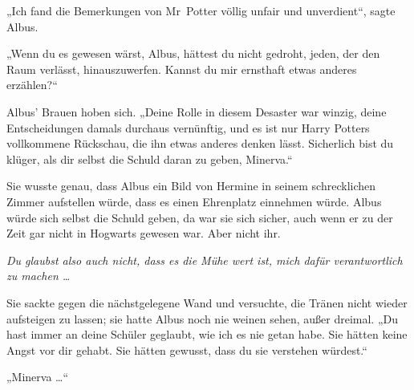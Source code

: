 „Ich fand die Bemerkungen von Mr~Potter völlig unfair und unverdient“, sagte Albus.

„Wenn du es gewesen wärst, Albus, hättest du nicht gedroht, jeden, der den Raum verlässt, hinauszuwerfen. Kannst du mir ernsthaft etwas anderes erzählen?“

Albus’ Brauen hoben sich.
„Deine Rolle in diesem Desaster war winzig, deine Entscheidungen damals durchaus vernünftig, und es ist nur Harry Potters vollkommene Rückschau, die ihn etwas anderes denken lässt. Sicherlich bist du klüger, als dir selbst die Schuld daran zu geben, Minerva.“

Sie wusste genau, dass Albus ein Bild von Hermine in seinem schrecklichen Zimmer aufstellen würde, dass es einen Ehrenplatz einnehmen würde. Albus würde sich selbst die Schuld geben, da war sie sich sicher, auch wenn er zu der Zeit gar nicht in Hogwarts gewesen war. Aber nicht ihr.

\emph{Du glaubst also auch nicht, dass es die Mühe wert ist, mich dafür verantwortlich zu machen …}

Sie sackte gegen die nächstgelegene Wand und versuchte, die Tränen nicht wieder aufsteigen zu lassen; sie hatte Albus noch nie weinen sehen, außer dreimal.
„Du hast immer an deine Schüler geglaubt, wie ich es nie getan habe. Sie hätten keine Angst vor dir gehabt. Sie hätten gewusst, dass du sie verstehen würdest.“

„Minerva …“

